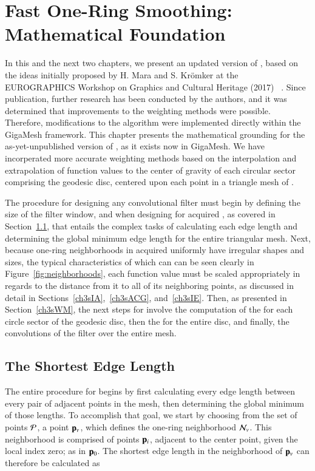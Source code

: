 \chapter{Fast One-Ring Smoothing: Mathematical Foundation}
\label{ch3}
In this and the next two chapters, we present an updated version of , based on the ideas initially proposed by H. Mara and S. Krömker at the EUROGRAPHICS Workshop on Graphics and Cultural Heritage (2017) ~\cite[s.~3.2]{Mara17}. Since publication, further research has been conducted by the authors, and it was determined that improvements to the weighting methods were possible. Therefore, modifications to the algorithm were implemented directly within the GigaMesh  framework. This chapter presents the mathematical grounding for the as-yet-unpublished version of , as it exists now in GigaMesh. We have incorperated more accurate weighting methods based on the interpolation and extrapolation of function values to the center of gravity of each circular sector comprising the geodesic disc, centered upon each point in a triangle mesh of \tdd{}.

The procedure for designing any convolutional filter must begin by defining the size of the filter window, and when designing for acquired \tdd{}, as covered in Section~\ref{ch3sSEL}, that entails the complex tasks of calculating each edge length and determining the global minimum edge length for the entire triangular mesh. Next, because one-ring neighborhoods in acquired \tdd{} uniformly have irregular shapes and sizes, the typical characteristics of which can can be seen clearly in Figure~\ref{fig:neighborhoods}, each function value must be scaled appropriately in regards to the distance from it to all of its neighboring points, as discussed in detail in Sections~\ref{ch3sIA},~\ref{ch3sACG}, and~\ref{ch3sIE}. Then, as presented in Section~\ref{ch3sWM}, the next steps for  involve the computation of the  for each circle sector of the geodesic disc, then the \wmfv{} for the entire disc, and finally, the convolutions of the filter over the entire mesh.

%
%
%
%
\section{The Shortest Edge Length}
\label{ch3sSEL}
The entire procedure for  begins by first calculating every edge length between every pair of adjacent points in the mesh, then determining the global minimum of those lengths. To accomplish that goal, we start by choosing from the set of points $\mathcal{P}$, a point $\mathbf{p}_v$, which defines the one-ring neighborhood $\mathcal{N}_v$. This neighborhood is comprised of points $\mathbf{p}_i$, adjacent to the center point, given the local index zero; as in $\mathbf{p}_0$. The shortest edge length in the neighborhood of $\mathbf{p}_v$ can therefore be calculated as

